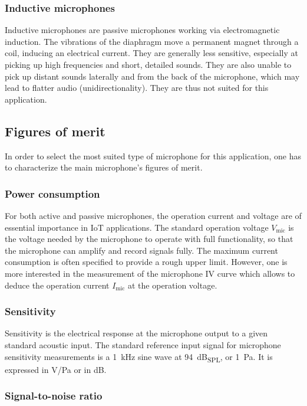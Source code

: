 \documentclass{EPL-master-thesis-covers-EN}
\newcommand{\te}[1]{\textrm{#1}}
\begin{document}
\subsubsection*{Inductive microphones}

Inductive microphones are passive microphones working via electromagnetic induction. The vibrations of the diaphragm move a permanent magnet through a coil, inducing an electrical current. They are generally less sensitive, especially at picking up high frequencies and short, detailed sounds. They are also unable to pick up distant sounds laterally and from the back of the microphone, which may lead to flatter audio (unidirectionality). They are thus not suited for this application.


\subsection*{Figures of merit}

In order to select the most suited type of microphone for this application, one has to characterize the main microphone's figures of merit.

\subsubsection*{Power consumption}

For both active and passive microphones, the operation current and voltage are of essential importance in IoT applications. The standard operation voltage $V_{\te{mic}}$ is the voltage needed by the microphone to operate with full functionality, so that the microphone can amplify and record signals fully. The maximum current consumption is often specified to provide a rough upper limit. However, one is more interested in the measurement of the microphone IV curve which allows to deduce the operation current $I_{\te{mic}}$ at the operation voltage.

\subsubsection*{Sensitivity}

Sensitivity is the electrical response at the microphone output to a given standard acoustic input. The standard reference input signal for microphone sensitivity measurements is a \SI{1}{kHz} sine wave at \SI{94}{dB_{SPL}}, or \SI{1}{Pa}. It is expressed in \si{V/Pa} or in \si{dB}.

\subsubsection*{Signal-to-noise ratio}
\end{document}
